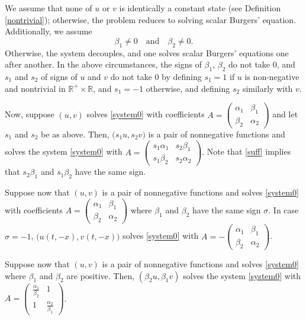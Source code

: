 \documentclass{amsart}
\theoremstyle{definition}
\numberwithin{equation}{section}
\begin{document}
We assume that none of $u$ or $v$ is identically a constant state (see Definition \ref{nontrivial}); otherwise, the problem reduces to solving  scalar Burgers' equation. Additionally, we assume
\begin{equation}
 \beta_1\ne 0 \quad \text{and} \quad \beta_2\ne0.
\end{equation}
Otherwise, the system decouples, and one solves scalar Burgers' equations one after another.  In the above circumstances, the signs of $\beta_1$, $\beta_2$ do not take $0$, and $s_1$ and $s_2$ of signs of $u$ and $v$ do not take $0$ by defining $s_1=1$ if $u$ is non-negative and nontrivial in $ \mathbb{R}^+\times \mathbb{R}$, and $s_1=-1$ otherwise, and defining $s_2$ similarly with $v$.

Now, suppose $(u,v)$ solves \eqref{system0} with coefficients $A = \begin{pmatrix} \alpha_1 & \beta_1 \\ \beta_2 & \alpha_2 \end{pmatrix}$ and let $s_1$ and $s_2$ be as above. Then, $\big(s_1 u, s_2 v)$ is a pair of nonnegative functions and solves the system \eqref{system0} with    $A = \begin{pmatrix} s_1 \alpha_1 & s_2 \beta_1 \\  s_1\beta_2 & s_2 \alpha_2 \end{pmatrix}$. Note that \eqref{suff} implies that $s_2\beta_1$ and $s_1\beta_2$ have the same sign. 

Suppose now that $(u,v)$ is a pair of nonnegative functions and solves \eqref{system0} with coefficients $A = \begin{pmatrix} \alpha_1 & \beta_1 \\ \beta_2 & \alpha_2 \end{pmatrix}$ where $\beta_1$ and $\beta_2$ have the same sign $\sigma$. In case $\sigma=-1$, $\big(u(t,-x), v(t,-x)\big)$ solves \eqref{system0} with    $A = -\begin{pmatrix} \alpha_1 & \beta_1 \\  \beta_2 & \alpha_2 \end{pmatrix}$. 

Suppose now that $(u,v)$ is a pair of nonnegative functions and solves \eqref{system0} where $\beta_1$ and $\beta_2$ are positive. Then, $(\beta_2u,\beta_1 v)$ solves the system \eqref{system0} with $A = \begin{pmatrix} \frac{\alpha_1}{\beta_2} & 1 \\ 1 & \frac{\alpha_2}{\beta_1} \end{pmatrix}$. 
\end{document}

